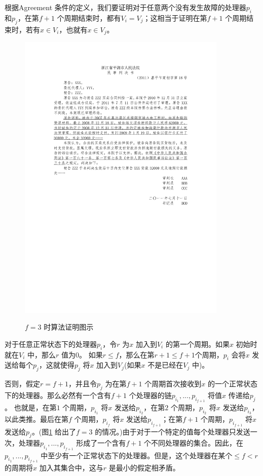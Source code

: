    根据Agreement 条件的定义，我们要证明对于任意两个没有发生故障的处理器$p_i$ 和$p_j$，在第$f+1$ 个周期结束时，都有$V_i=V_j$；这相当于证明在第$f+1$ 个周期结束时，若有$x \in V_i$，也就有$x \in V_j$。
    \begin{figure}[ht]
        \centering
        \includegraphics[width=10cm]{figures/Figure3}\\
        \caption{$f=3$ 时算法证明图示}\label{Figure3}
    \end{figure}

    对于任意正常状态下的处理器$p_i$，令$r$ 为$x$ 加入到$V_i$ 的第一个周期。如果$x$ 初始时就在$V_i$ 中，那么$r$ 值为$0$。 如果$r \leq f$，那么在第$r+1 \leq f+1$个周期，$p_i$ 会将$x$ 发送给每个$p_j$，这就使得$p_j$ 将$x$ 加入到$V_j$(如果$x$ 不是已经在$V_j$ 中)。

    否则，假定$r=f+1$，并且令$p_j$ 为在第$f+1$ 个周期首次接收到$x$ 的一个正常状态下的处理器。那么必然有一个含有$f+1$ 个处理器的链$p_{i_1},...,p_{i_{f+1}}$ 将值$x$ 传递给$p_j$。 也就是，在第$1$ 个周期，$p_{i_1}$ 将$x$ 发送给$p_{i_2}$，在第$2$ 个周期，$p_{i_2}$ 将$x$ 发送给$p_{i_3}$，以此类推。最后在第$f$ 个周期，$p_{i_f}$ 将$x$ 发送给$p_{i_{f+1}}$；在第$f+1$ 个周期，$p_{i_{f+1}}$ 将$x$ 发送给$p_j$。(图\ref{Figure3} 给出了$f=3$ 的情况。)由于对于一个特定的值每个处理器只发送一次，处理器$p_{i_1},...,p_{i_{f+1}}$ 形成了一个含有$f+1$ 个不同处理器的集合。因此，在$p_{i_1},...,p_{i_{f+1}}$ 中至少有一个正常状态下的处理器。但是，这个处理器在某个$\leq f < r$ 的周期将$x$ 加入其集合中，这与$r$ 是最小的假定相矛盾。

